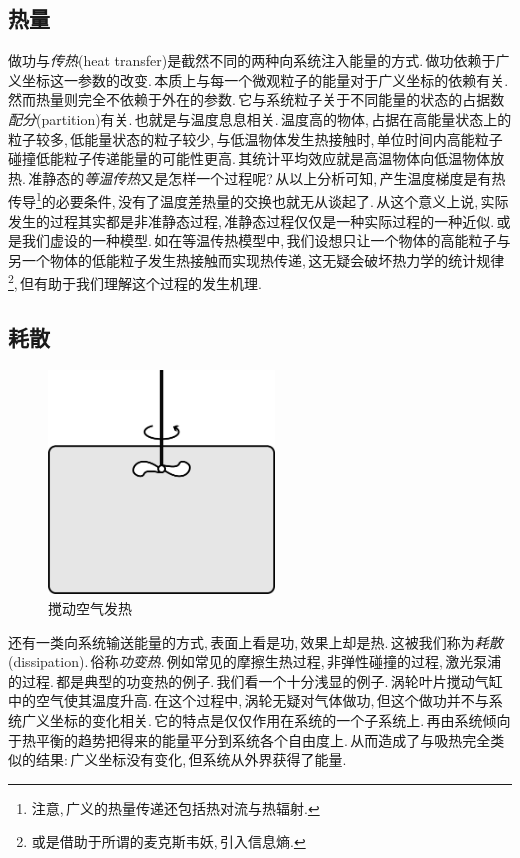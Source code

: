 \subsection{热量}
做功与\emph{传热}(heat transfer)是截然不同的两种向系统注入能量的方式.\,做功依赖于广义坐标这一参数的改变.\,本质上与每一个微观粒子的能量对于广义坐标的依赖有关.\,然而热量则完全不依赖于外在的参数.\,它与系统粒子关于不同能量的状态的占据数\emph{配分}(partition)有关.\,也就是与温度息息相关.\,温度高的物体,\,占据在高能量状态上的粒子较多,\,低能量状态的粒子较少,\,与低温物体发生热接触时,\,单位时间内高能粒子碰撞低能粒子传递能量的可能性更高.\,其统计平均效应就是高温物体向低温物体放热.\,准静态的\emph{等温传热}又是怎样一个过程呢?\,从以上分析可知,\,产生温度梯度是有热传导\footnote{注意,\,广义的热量传递还包括热对流与热辐射.}的必要条件,\,没有了温度差热量的交换也就无从谈起了.\,从这个意义上说,\,实际发生的过程其实都是非准静态过程,\,准静态过程仅仅是一种实际过程的一种近似.\,或是我们虚设的一种模型.\,如在等温传热模型中,\,我们设想只让一个物体的高能粒子与另一个物体的低能粒子发生热接触而实现热传递,\,这无疑会破坏热力学的统计规律\footnote{或是借助于所谓的麦克斯韦妖,\,引入信息熵.},\,但有助于我们理解这个过程的发生机理.

\npg{-10pt}

\subsection{耗散}
\begin{figure}
\centering
\includegraphics[width=6cm]{image/5-1-2.png}
\caption{搅动空气发热}\label{fig:1-2}
\end{figure}
还有一类向系统输送能量的方式,\,表面上看是功,\,效果上却是热.\,这被我们称为\emph{耗散}(dissipation).\,俗称\emph{功变热}.\,例如常见的摩擦生热过程,\,非弹性碰撞的过程,\,激光泵浦的过程.\,都是典型的功变热的例子.\,我们看一个十分浅显的例子.\,涡轮叶片搅动气缸中的空气使其温度升高.\,在这个过程中,\,涡轮无疑对气体做功,\,但这个做功并不与系统广义坐标的变化相关.\,它的特点是仅仅作用在系统的一个子系统上.\,再由系统倾向于热平衡的趋势把得来的能量平分到系统各个自由度上.\,从而造成了与吸热完全类似的结果:\,广义坐标没有变化,\,但系统从外界获得了能量.

